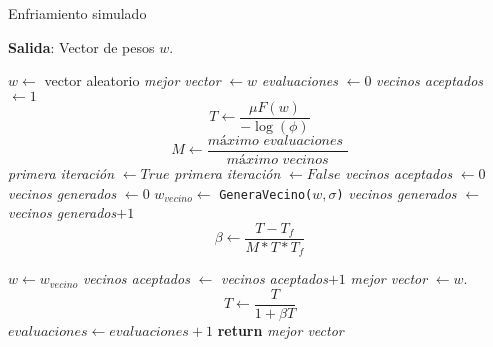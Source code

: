 \begin{algorithm}[H]
    \caption{Enfriamiento simulado}
        \hspace*{\algorithmicindent} 
        \textbf{Salida}:
        Vector de pesos $w$.        
    \begin{algorithmic}[1]
            
          \State $w \gets$ vector aleatorio   
          \State \textit{mejor vector} $\gets w$ 
          \State \textit{evaluaciones} $\gets 0$ 
          \State  \textit{vecinos aceptados} $\gets 1$
          \State  
          \begin{equation*}
              T 
              \gets
              \frac{ \mu F(w)}{ - \log(\phi)}
          \end{equation*}
          \State \begin{equation*}
            M \gets \frac{ \textit{máximo evaluaciones }}{\textit{máximo vecinos}}
          \end{equation*}
        \State \textit{primera iteración} $\gets True$ 
        \State \textit{primera iteración} $\gets False$ 
        \State \textit{vecinos aceptados}  $\gets 0$ 
        \State \textit{vecinos generados}  $\gets 0$ 
          \State $w_{vecino} \gets$ \texttt{GeneraVecino($w,\sigma$)}
          \State \textit{vecinos generados} $\gets$ \textit{vecinos generados}$+1$
          \State 
          \begin{equation*}
            \beta \gets 
            \frac{T -  T_f}{ M * T * T_f}
          \end{equation*}

            \State $w \gets w_{vecino}$
            \State \textit{vecinos aceptados} $\gets$ \textit{vecinos aceptados}$+1$
              \State \textit{mejor vector} $\gets w$. 
            \EndIf
          \EndIf
          \EndWhile
        \State
        \begin{equation*}
          T \gets
          \frac{T}{1 + \beta T}
        \end{equation*}
        \State $evaluaciones \gets evaluaciones +1$
        \EndWhile
        \State \textbf{return} \textit{mejor vector}
      \EndProcedure
    \end{algorithmic}
  \end{algorithm}

